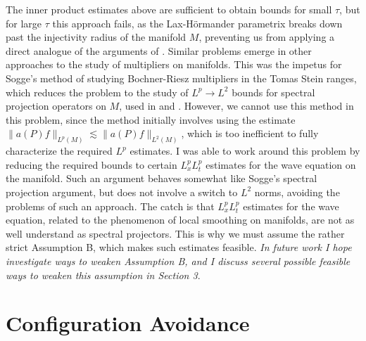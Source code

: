 \documentclass[11pt]{article}
\begin{document}
The inner product estimates above are sufficient to obtain bounds for small $\tau$, but for large $\tau$ this approach fails, as the Lax-H\"{o}rmander parametrix breaks down past the injectivity radius of the manifold $M$, preventing us from applying a direct analogue of the arguments of \cite{HeoNazarovSeeger}. Similar problems emerge in other approaches to the study of multipliers on manifolds. This was the impetus for Sogge's method of studying Bochner-Riesz multipliers in the Tomas Stein ranges, which reduces the problem to the study of $L^p \to L^2$ bounds for spectral projection operators on $M$, used in \cite{SoggeRieszMeans} and \cite{KimManifold}. %
However, we cannot use this method in this problem, since the method initially involves using the estimate $\| a(P) f \|_{L^p(M)} \lesssim \| a(P) f \|_{L^2(M)}$, which is too inefficient to fully characterize the required $L^p$ estimates.
I was able to work around this problem by reducing the required bounds to certain $L^p_x L^p_t$ estimates for the wave equation on the manifold. Such an argument behaves somewhat like Sogge's spectral projection argument, but does not involve a switch to $L^2$ norms, avoiding the problems of such an approach. The catch is that $L^p_x L^p_t$ estimates for the wave equation, related to the phenomenon of local smoothing on manifolds, are not as well understand as spectral projectors. This is why we must assume the rather strict Assumption B, which makes such estimates feasible. \emph{In future work I hope investigate ways to weaken Assumption B, and I discuss several possible feasible ways to weaken this assumption in Section 3}.

\section{Configuration Avoidance} \label{Section2}
\end{document}
